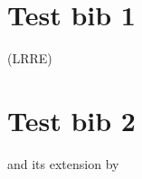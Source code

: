 \documentclass{report}
\begin{document}
\chapter{Test bib 1}
\cite{A12} (LRRE) \cite{XQ11}
\printbibliography[segment=1,heading=subbibliography]

\chapter{Test bib 2}
\cite{NS87} and its extension by \cite{Sven94}
\printbibliography[segment=2,heading=subbibliography]

\nocite{*}
\printbibliography
\end{document}
